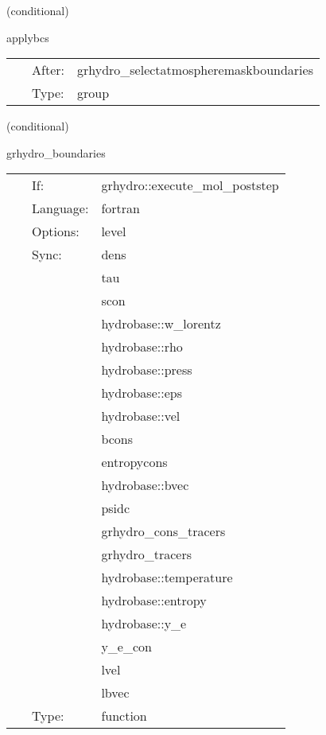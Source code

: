 \documentclass{article}
\begin{document}
   (conditional) 

\hspace{5mm} applybcs 

\hspace{5mm}{\it apply boundary conditions to real-valued atmosphere mask } 


\hspace{5mm}

 \begin{tabular*}{160mm}{cll} 
~ & After:  & grhydro\_selectatmospheremaskboundaries \\ 
~ & Type:  & group \\ 
\end{tabular*} 


\vspace{5mm}

   (conditional) 

\hspace{5mm} grhydro\_boundaries 

\hspace{5mm}{\it select grhydro boundary conditions } 


\hspace{5mm}

 \begin{tabular*}{160mm}{cll} 
~ & If:  & grhydro::execute\_mol\_poststep \\ 
~ & Language:  & fortran \\ 
~ & Options:  & level \\ 
~ & Sync:  & dens \\ 
~& ~ &tau\\ 
~& ~ &scon\\ 
~& ~ &hydrobase::w\_lorentz\\ 
~& ~ &hydrobase::rho\\ 
~& ~ &hydrobase::press\\ 
~& ~ &hydrobase::eps\\ 
~& ~ &hydrobase::vel\\ 
~& ~ &bcons\\ 
~& ~ &entropycons\\ 
~& ~ &hydrobase::bvec\\ 
~& ~ &psidc\\ 
~& ~ &grhydro\_cons\_tracers\\ 
~& ~ &grhydro\_tracers\\ 
~& ~ &hydrobase::temperature\\ 
~& ~ &hydrobase::entropy\\ 
~& ~ &hydrobase::y\_e\\ 
~& ~ &y\_e\_con\\ 
~& ~ &lvel\\ 
~& ~ &lbvec\\ 
~ & Type:  & function \\ 
\end{tabular*} 
\end{document}

